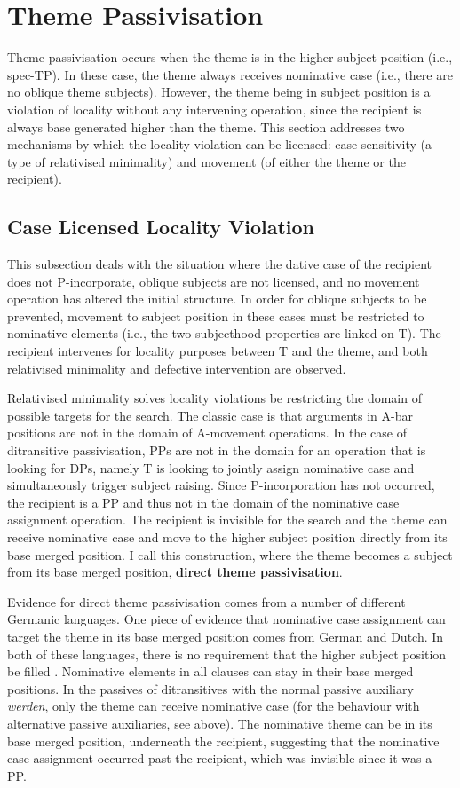 \section{Theme Passivisation}
Theme passivisation occurs when the theme is in the higher subject position (i.e., spec-TP). In these case, the theme always receives nominative case (i.e., there are no oblique theme subjects). However, the theme being in subject position is a violation of locality without any intervening operation, since the recipient is always base generated higher than the theme. This section addresses two mechanisms by which the locality violation can be licensed: case sensitivity (a type of relativised minimality) and movement (of either the theme or the recipient).

\subsection{Case Licensed Locality Violation}
This subsection deals with the situation where the dative case of the recipient does not P-incorporate, oblique subjects are not licensed, and no movement operation has altered the initial structure. In order for oblique subjects to be prevented, movement to subject position in these cases must be restricted to nominative elements (i.e., the two subjecthood properties are linked on T). The recipient intervenes for locality purposes between T and the theme, and both relativised minimality and defective intervention are observed.

Relativised minimality \citep{Rizzi.1990} solves locality violations be restricting the domain of possible targets for the search. The classic case is that arguments in A-bar positions are not in the domain of A-movement operations. In the case of ditransitive passivisation, PPs are not in the domain for an operation that is looking for DPs, namely T is looking to jointly assign nominative case and simultaneously trigger subject raising. Since P-incorporation has not occurred, the recipient is a PP and thus not in the domain of the nominative case assignment operation. The recipient is invisible for the search and the theme can receive nominative case and move to the higher subject position directly from its base merged position. I call this construction, where the theme becomes a subject from its base merged position, \textbf{direct theme passivisation}.

Evidence for direct theme passivisation comes from a number of different Germanic languages. One piece of evidence that nominative case assignment can target the theme in its base merged position comes from German and Dutch. In both of these languages, there is no requirement that the higher subject position be filled \citep{Besten.1990}. Nominative elements in all clauses can stay in their base merged positions. In the passives of ditransitives with the normal passive auxiliary \textit{werden}, only the theme can receive nominative case (for the behaviour with alternative passive auxiliaries, see above). The nominative theme can be in its base merged position, underneath the recipient, suggesting that the nominative case assignment occurred past the recipient, which was invisible since it was a PP.

